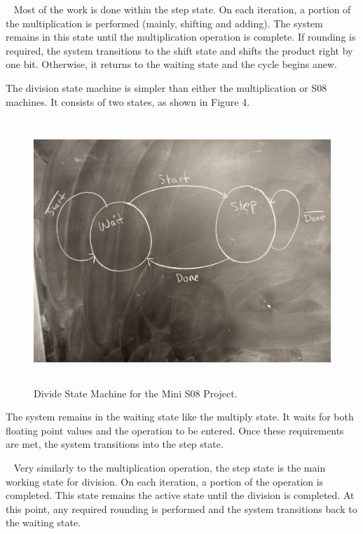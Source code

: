 \documentclass[letterpaper, 12pt]{article}
\begin{document}
\begin{flushleft}
~\newline
Most of the work is done within the step state.  On each iteration, a portion of the multiplication is performed (mainly, shifting and adding).  The system remains in this state until the multiplication operation is complete.  If rounding is required, the system transitions to the shift state and shifts the product right by one bit.  Otherwise, it returns to the waiting state and the cycle begins anew.

\newpage
The division state machine is simpler than either the multiplication or S08 machines.  It consists of two states, as shown in Figure 4.

 \begin{figure}[H]
	\centering
	\includegraphics[width=\linewidth,height=10cm,keepaspectratio]{divide_states.jpg}
	\caption[Mini S08 Division State Machine Diagram]{Divide State Machine for the Mini S08 Project.}
	\label{fig:arch}
\end{figure}

The system remains in the waiting state like the multiply state. It waits for both floating point values and the operation to be entered.  Once these requirements are met, the system transitions into the step state.

~\newline
Very similarly to the multiplication operation, the step state is the main working state for division.  On each iteration, a portion of the operation is completed.  This state remains the active state until the division is completed.  At this point, any required rounding is performed and the system transitions back to the waiting state.


\end{flushleft}
\end{document}
